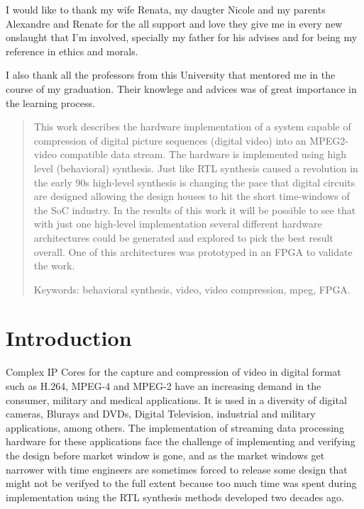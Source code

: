 \documentclass[a4paper, 12pt]{article}
\begin{document}
I would like to thank my wife Renata, my daugter Nicole and my parents Alexandre and Renate for the all support and love they give me in every new onslaught that I'm involved, specially my father for his advises and for being my reference in ethics and morals.

I also thank all the professors from this University that mentored me in the course of my graduation. Their knowlege and advices was of great importance in the learning process.

\pagebreak

\begin{abstract}

This work describes the hardware implementation of a system capable of compression of digital picture sequences (digital video) into an MPEG2-video compatible data stream. The hardware is implemented using high level (behavioral) synthesis.  Just like RTL synthesis caused a revolution in the early 90s high-level synthesis is changing the pace that digital circuits are designed allowing the design houses to hit the short time-windows of the SoC industry. In the results of this work it will be possible to see that with just one high-level implementation several different hardware architectures could be generated and explored to pick the best result overall. One of this architectures was prototyped in an FPGA to validate the work.

Keywords: behavioral synthesis, video, video compression, mpeg, FPGA.

\end{abstract}


\pagebreak

\tableofcontents

\pagebreak

\listoffigures

\pagebreak

\listoftables

\pagebreak


\section*{Introduction}

Complex IP Cores for the capture and compression of video in digital format such as H.264, MPEG-4 and MPEG-2\cite{mpeg2video} have an increasing demand in the consumer, military and medical applications. It is used in a diversity of digital cameras, Blurays and DVDs, Digital Television, industrial and military applications, among others. The implementation of streaming data processing hardware for these applications face the challenge of implementing and verifying the design before market window is gone, and as the market windows get narrower with time engineers are sometimes forced to release some design that might not be verifyed to the full extent because too much time was spent during implementation using the RTL synthesis methods developed two decades ago. 
\end{document}
